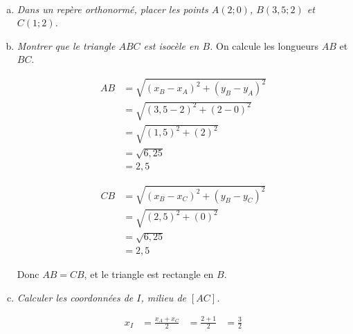 \documentclass[12pt]{article}
\begin{document}
\begin{exercice}~
\begin{enumerate}[(a)]
  \item \emph{Dans un repère orthonormé, placer les points $A(2;0)$, $B(3,5;2)$ et $C(1;2)$.}
    \begin{center}
    \end{center}

  \item \emph{Montrer que le triangle $ABC$ est isocèle en $B$.}
    On calcule les longueurs $AB$ et $BC$.

    \begin{multicols}{2}
    \begin{align*}
      AB&=\sqrt{\left( x_B-x_A \right)^2+\left( y_B-y_A \right)^2} \\
        &=\sqrt{\left( 3,5-2  \right)^2+\left( 2  -0   \right)^2} \\
        &=\sqrt{\left( 1,5 \right)^2+\left( 2 \right)^2}\\
        &=\sqrt{6,25}\\
        &=2,5
    \end{align*}

    \begin{align*}
      CB&=\sqrt{\left( x_B-x_C \right)^2+\left( y_B-y_C \right)^2} \\
        &=\sqrt{\left( 2,5 \right)^2+\left( 0 \right)^2}\\
        &=\sqrt{6,25}\\
        &=2,5
    \end{align*}
  \end{multicols}
  Donc $AB=CB$, et le triangle est rectangle en $B$.
  \item \emph{Calculer les coordonnées de $I$, milieu de $\left[AC\right]$.}
    \begin{multicols}{2}
    \begin{align*}
      x_I&=\frac{x_A+x_C}{2}
         &=\frac{2+1}{2}
         &=\frac{3}{2}
    \end{align*}


\end{multicols}
\end{enumerate}
\end{exercice}
\end{document}
